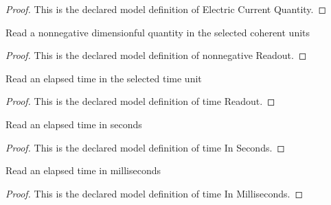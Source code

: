 \begin{proof}
  This is the declared model definition of Electric Current Quantity.
\end{proof}
\begin{definition}
  \label{def:physics:phyx-mini-0989:phyxminiproblems-problemphyxmini0989-nonnegativereadout}
  Read a nonnegative dimensionful quantity in the selected coherent units
\end{definition}
\begin{proof}
  This is the declared model definition of nonnegative Readout.
\end{proof}
\begin{definition}
  \label{def:physics:phyx-mini-0989:phyxminiproblems-problemphyxmini0989-timereadout}
  Read an elapsed time in the selected time unit
\end{definition}
\begin{proof}
  This is the declared model definition of time Readout.
\end{proof}
\begin{definition}
  \label{def:physics:phyx-mini-0989:phyxminiproblems-problemphyxmini0989-timeinseconds}
  Read an elapsed time in seconds
\end{definition}
\begin{proof}
  This is the declared model definition of time In Seconds.
\end{proof}
\begin{definition}
  \label{def:physics:phyx-mini-0989:phyxminiproblems-problemphyxmini0989-timeinmilliseconds}
  Read an elapsed time in milliseconds
\end{definition}
\begin{proof}
  This is the declared model definition of time In Milliseconds.
\end{proof}
